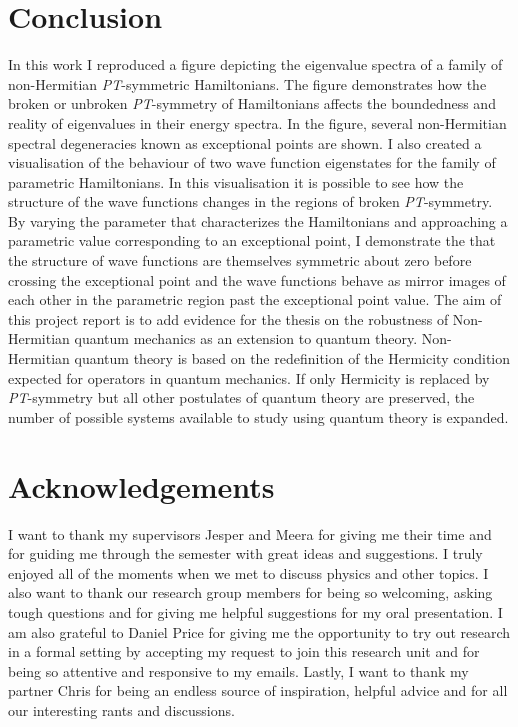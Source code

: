 \documentclass[10pt, a4paper, singlespacing]{report}
\newcommand\PT{\emph{PT}}
\begin{document}
\chapter{Conclusion}\label{Conclusion}
 In this work I reproduced a figure depicting the eigenvalue spectra of a family of non-Hermitian \PT-symmetric Hamiltonians. The figure demonstrates how the broken or unbroken \PT-symmetry of Hamiltonians affects the boundedness and reality of eigenvalues in their energy spectra. In the figure, several non-Hermitian spectral degeneracies known as exceptional points are shown. I also created a visualisation of the behaviour of two wave function eigenstates for the family of parametric Hamiltonians. In this visualisation it is possible to see how the structure of the wave functions changes in the regions of broken \PT-symmetry. By varying the parameter that characterizes the Hamiltonians and approaching a parametric value corresponding to an exceptional point, I demonstrate the that the structure of wave functions are themselves symmetric about zero before crossing the exceptional point and the wave functions behave as mirror images of each other in the parametric region past the exceptional point value. The aim of this project report is to add evidence for the thesis on the robustness of Non-Hermitian quantum mechanics as an extension to quantum theory. Non-Hermitian quantum theory is based on the redefinition of the Hermicity condition expected for operators in quantum mechanics. If only Hermicity is replaced by \PT-symmetry but all other postulates of quantum theory are preserved, the number of possible systems available to study using quantum theory is expanded.

\chapter{Acknowledgements}\label{Acknowledgements}
I want to thank my supervisors Jesper and Meera for giving me their time and for guiding me through the semester with great ideas and suggestions. I truly enjoyed all of the moments when we met to discuss physics and other topics. I also want to thank our research group members for being so welcoming, asking tough questions and for giving me helpful suggestions for my oral presentation. I am also grateful to Daniel Price for giving me the opportunity to try out research in a formal setting by accepting my request to join this research unit and for being so attentive and responsive to my emails. Lastly, I want to thank my partner Chris for being an endless source of inspiration, helpful advice and for all our interesting rants and discussions. 
\end{document}
